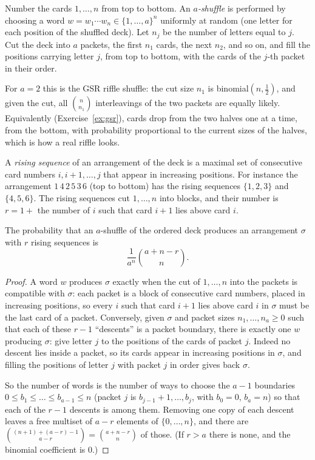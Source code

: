 \begin{definition}\label{def:ashuffle}
Number the cards $1,\dots,n$ from top to bottom. An \emph{$a$-shuffle} is performed by choosing a word $w=w_1\cdots w_n\in\{1,\dots,a\}^n$ uniformly
at random (one letter for each position of the shuffled deck). Let $n_j$ be the number of letters equal to $j$. Cut the deck into $a$
packets, the first $n_1$ cards, the next $n_2$, and so on, and fill the positions carrying letter $j$, from top to bottom, with the
cards of the $j$-th packet in their order.
\end{definition}

For $a=2$ this is the GSR riffle shuffle: the cut size $n_1$ is binomial$(n,\frac12)$, and given the cut, all $\binom n{n_1}$ interleavings of the two
packets are equally likely. Equivalently (Exercise~\ref{ex:gsr}), cards drop from the two halves one at a time, from the bottom,
with probability proportional to the current sizes of the halves, which is how a real riffle looks.

A \emph{rising sequence} of an arrangement of the deck is a maximal set of consecutive card numbers $i,i+1,\dots,j$ that appear in
increasing positions. For instance the arrangement $1\,4\,2\,5\,3\,6$ (top to bottom) has the rising sequences $\{1,2,3\}$ and $\{4,5,6\}$.
The rising sequences cut $1,\dots,n$ into blocks, and their number is $r=1+$ the number of $i$ such that card $i+1$ lies above card $i$.

\begin{theorem}\label{thm:bayerdiaconis}
The probability that an $a$-shuffle of the ordered deck produces an arrangement $\sigma$ with $r$ rising sequences is
\[
\frac1{a^n}\binom{a+n-r}n.
\]
\end{theorem}
\begin{proof}
A word $w$ produces $\sigma$ exactly when the cut of $1,\dots,n$ into the packets is compatible with $\sigma$: each packet is a block of consecutive
card numbers, placed in increasing positions, so every $i$ such that card $i+1$ lies above card $i$ in $\sigma$ must be the last card of a
packet. Conversely, given $\sigma$ and packet sizes $n_1,\dots,n_a\ge0$ such that each of these $r-1$ ``descents'' is a packet boundary, there is exactly one
$w$ producing $\sigma$: give letter $j$ to the positions of the cards of packet $j$. Indeed no descent lies inside a packet, so its cards appear in
increasing positions in $\sigma$, and filling the positions of letter $j$ with packet $j$ in order gives back $\sigma$.

So the number of words is the number of ways to choose the $a-1$ boundaries $0\le b_1\le\dots\le b_{a-1}\le n$ (packet $j$ is $b_{j-1}+1,\dots,b_j$, with $b_0=0$, $b_a=n$)
so that each of the $r-1$ descents is among them. Removing one copy of each descent leaves a free multiset of $a-r$ elements of
$\{0,\dots,n\}$, and there are $\binom{(n+1)+(a-r)-1}{a-r}=\binom{a+n-r}n$ of those. (If $r>a$ there is none, and the binomial coefficient is $0$.)
\end{proof}

